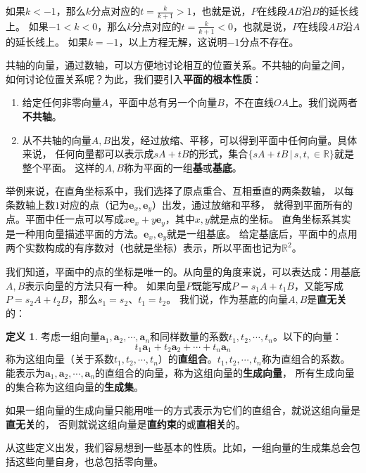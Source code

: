 \documentclass[12pt,UTF8]{ctexbook}
\theoremstyle{definition}
\newtheorem{df}{定义}[section]
\theoremstyle{plain}
\begin{document}
如果$k<-1$，那么$k$分点对应的$t = \frac{k}{k+1} > 1$，也就是说，$P$在线段$AB$沿$B$的延长线上。
如果$-1<k<0$，那么$k$分点对应的$t = \frac{k}{k+1} < 0$，也就是说，$P$在线段$AB$沿$A$的延长线上。
如果$k=-1$，以上方程无解，这说明$-1$分点不存在。

共轴的向量，通过数轴，可以方便地讨论相互的位置关系。不共轴的向量之间，
如何讨论位置关系呢？为此，我们要引入\textbf{平面的根本性质}：
\begin{enumerate}
    \item 给定任何非零向量$A$，平面中总有另一个向量$B$，不在直线$OA$上。我们说两者\textbf{不共轴}。
    \item 从不共轴的向量$A, B$出发，经过放缩、平移，可以得到平面中任何向量。具体来说，
    任何向量都可以表示成$sA + tB$的形式，集合$\{sA + tB \,|\, s, t, \in\mathbb{R}\}$就是整个平面。
    这样的$A, B$称为平面的一组\textbf{基}或\textbf{基底}。
\end{enumerate}

举例来说，在直角坐标系中，我们选择了原点重合、互相垂直的两条数轴，
以每条数轴上数$1$对应的点（记为$\mathbf{e}_x, \mathbf{e}_y$）出发，通过放缩和平移，
就得到平面所有的点。平面中任一点可以写成$x\mathbf{e}_x + y\mathbf{e}_y$，其中$x,y$就是点的坐标。
直角坐标系其实是一种用向量描述平面的方法。$\mathbf{e}_x, \mathbf{e}_y$就是一组基底。
给定基底后，平面中的点用两个实数构成的有序数对（也就是坐标）表示，所以平面也记为$\mathbb{R}^2$。

我们知道，平面中的点的坐标是唯一的。从向量的角度来说，可以表达成：用基底$A, B$表示向量的方法只有一种。
如果向量$P$既能写成$P = s_1A + t_1B$，又能写成$P = s_2A + t_2B$，那么$s_1 = s_2$、$t_1 = t_2$。
我们说，作为基底的向量$A,B$是\textbf{直无关}的：
\begin{df}
    考虑一组向量$\mathbf{a}_1, \mathbf{a}_2, \cdots , \mathbf{a}_n$和同样数量的系数$t_1, t_2, \cdots, t_n$。以下的向量：
    $$ t_1\mathbf{a}_1 + t_2\mathbf{a}_2 + \cdots + t_n\mathbf{a}_n$$
    称为这组向量（关于系数$t_1, t_2, \cdots, t_n$）的\textbf{直组合}。$t_1, t_2, \cdots, t_n$称为直组合的系数。
    能表示为$\mathbf{a}_1, \mathbf{a}_2, \cdots , \mathbf{a}_n$的直组合的向量，称为这组向量的\textbf{生成向量}，
    所有生成向量的集合称为这组向量的\textbf{生成集}。

    如果一组向量的生成向量只能用唯一的方式表示为它们的直组合，就说这组向量是\textbf{直无关}的，
    否则就说这组向量是\textbf{直约束}的或\textbf{直相关}的。
\end{df}
从这些定义出发，我们容易想到一些基本的性质。比如，一组向量的生成集总会包括这些向量自身，也总包括零向量。
\end{document}
